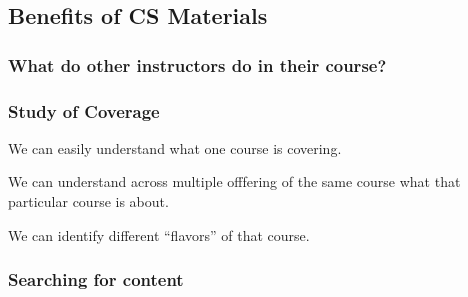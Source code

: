\documentclass[aspectratio=169]{beamer}
\begin{document}
\begin{frame}
  \frametitle{}
\end{frame}


\subsection{Benefits of CS Materials}


\subsubsection{What do other instructors do in their course?}


\begin{frame}
  \frametitle{Study of Coverage}

  We can easily understand what one course is covering.

  We can understand across multiple offfering of the same course what that particular course is about.

  We can identify different ``flavors'' of that course.  
\end{frame}



\subsubsection{Searching for content}
\end{document}
